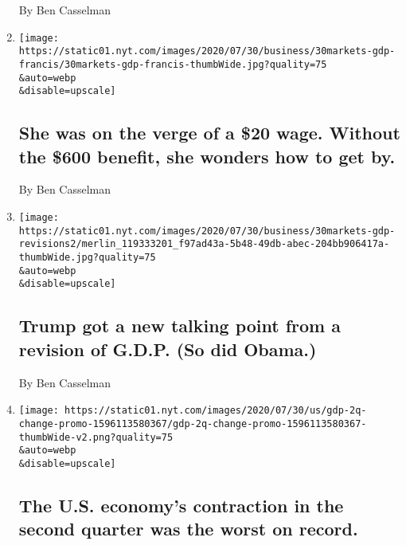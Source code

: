 \begin{enumerate}
  By Ben Casselman
\item
  \href{/2020/07/30/business/she-was-on-the-verge-of-a-20-wage-without-the-600-benefit-she-wonders-how-to-get-by.html}{}

  \texttt{[image: https://static01.nyt.com/images/2020/07/30/business/30markets-gdp-francis/30markets-gdp-francis-thumbWide.jpg?quality=75\\\&auto=webp\\\&disable=upscale]}

  \hypertarget{she-was-on-the-verge-of-a-20-wage-without-the-600-benefit-she-wonders-how-to-get-by}{%
  \subsection{She was on the verge of a \$20 wage. Without the \$600
  benefit, she wonders how to get
  by.}\label{she-was-on-the-verge-of-a-20-wage-without-the-600-benefit-she-wonders-how-to-get-by}}

  By Ben Casselman
\item
  \href{/2020/07/30/business/trump-got-a-new-talking-point-from-a-revision-of-gdp-so-did-obama.html}{}

  \texttt{[image: https://static01.nyt.com/images/2020/07/30/business/30markets-gdp-revisions2/merlin\_119333201\_f97ad43a-5b48-49db-abec-204bb906417a-thumbWide.jpg?quality=75\\\&auto=webp\\\&disable=upscale]}

  \hypertarget{trump-got-a-new-talking-point-from-a-revision-of-gdp-so-did-obama}{%
  \subsection{Trump got a new talking point from a revision of G.D.P.
  (So did
  Obama.)}\label{trump-got-a-new-talking-point-from-a-revision-of-gdp-so-did-obama}}

  By Ben Casselman
\item
  \href{/live/2020/07/30/business/stock-market-today-coronavirus/the-us-economys-contraction-in-the-second-quarter-was-the-worst-on-record}{}

  \texttt{[image: https://static01.nyt.com/images/2020/07/30/us/gdp-2q-change-promo-1596113580367/gdp-2q-change-promo-1596113580367-thumbWide-v2.png?quality=75\\\&auto=webp\\\&disable=upscale]}

  \hypertarget{the-us-economys-contraction-in-the-second-quarter-was-the-worst-on-record}{%
  \subsection{The U.S. economy's contraction in the second quarter was
  the worst on
  record.}\label{the-us-economys-contraction-in-the-second-quarter-was-the-worst-on-record}}


\end{enumerate}
